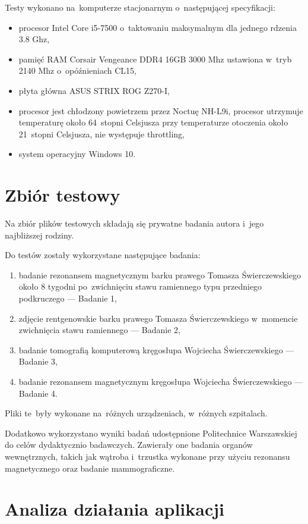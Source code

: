 \documentclass[a4paper,11pt,twoside,openright]{report}
\theoremstyle{definition}
\begin{document}
Testy wykonano na~komputerze stacjonarnym o~następującej specyfikacji:
\begin{itemize}[noitemsep]
\item procesor Intel Core i5-7500 o~taktowaniu maksymalnym dla jednego rdzenia 3.8 Ghz,
\item pamięć RAM Corsair Vengeance DDR4 16GB 3000 Mhz ustawiona w~tryb 2140 Mhz o~opóźnieniach CL15,
\item płyta główna ASUS STRIX ROG Z270-I,
\item procesor jest chłodzony powietrzem przez Noctuę NH-L9i, procesor utrzymuje
temperaturę około 64~stopni Celsjusza przy temperaturze otoczenia około 21~stopni
Celsjusza, nie występuje throttling,
\item system operacyjny Windows 10.
\end{itemize}

\section {Zbiór testowy}

Na zbiór plików testowych składają się prywatne badania autora i~jego najbliższej rodziny.

Do testów zostały wykorzystane następujące badania:
\begin{enumerate}[noitemsep]
\item badanie rezonansem magnetycznym barku prawego Tomasza Świerczewskiego około
8 tygodni po~zwichnięciu stawu ramiennego typu przedniego podkruczego --- Badanie 1,
\item zdjęcie rentgenowskie barku prawego Tomasza Świerczewskiego w~momencie zwichnięcia stawu ramiennego --- Badanie 2,
\item badanie tomografią komputerową kręgosłupa Wojciecha Świerczewskiego --- Badanie 3,
\item badanie rezonansem magnetycznym kręgosłupa Wojciecha Świerczewskiego --- Badanie 4.
\end{enumerate}

Pliki te~były wykonane na~różnych urządzeniach, w~różnych szpitalach.

Dodatkowo wykorzystano wyniki badań udostępnione Politechnice Warszawskiej do
celów dydaktycznio badawczych. Zawierały one badania organów wewnętrznych, takich
jak wątroba i~trzustka wykonane przy użyciu rezonansu magnetycznego oraz badanie mammograficzne.

\section {Analiza działania aplikacji}
\end{document}
